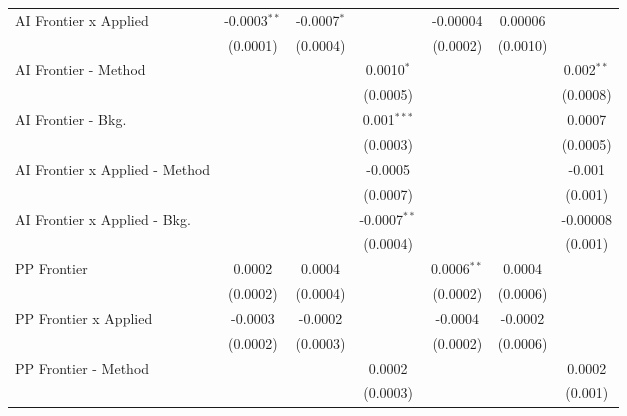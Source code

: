\begin{tabular}{lcccccc}
   AI Frontier x Applied          & -0.0003$^{**}$ & -0.0007$^{*}$ &                & -0.00004       & 0.00006        &   \\   
                                  & (0.0001)       & (0.0004)      &                & (0.0002)       & (0.0010)       &   \\   
   AI Frontier - Method           &                &               & 0.0010$^{*}$   &                &                & 0.002$^{**}$\\   
                                  &                &               & (0.0005)       &                &                & (0.0008)\\   
   AI Frontier - Bkg.             &                &               & 0.001$^{***}$  &                &                & 0.0007\\   
                                  &                &               & (0.0003)       &                &                & (0.0005)\\   
   AI Frontier x Applied - Method &                &               & -0.0005        &                &                & -0.001\\   
                                  &                &               & (0.0007)       &                &                & (0.001)\\   
   AI Frontier x Applied - Bkg.   &                &               & -0.0007$^{**}$ &                &                & -0.00008\\   
                                  &                &               & (0.0004)       &                &                & (0.001)\\   
   PP Frontier                    & 0.0002         & 0.0004        &                & 0.0006$^{**}$  & 0.0004         &   \\   
                                  & (0.0002)       & (0.0004)      &                & (0.0002)       & (0.0006)       &   \\   
   PP Frontier x Applied          & -0.0003        & -0.0002       &                & -0.0004        & -0.0002        &   \\   
                                  & (0.0002)       & (0.0003)      &                & (0.0002)       & (0.0006)       &   \\   
   PP Frontier - Method           &                &               & 0.0002         &                &                & 0.0002\\   
                                  &                &               & (0.0003)       &                &                & (0.001)\\   

\end{tabular}
